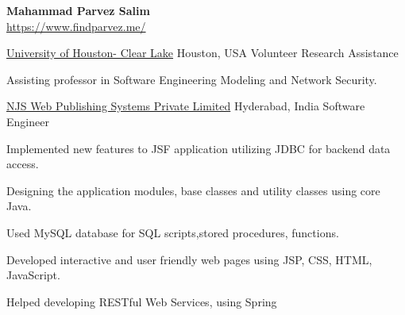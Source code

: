 \documentclass[10pt]{article}
\begin{document}
	
\begin{center}
	\textbf{\LARGE Mahammad Parvez Salim}\\[0.5ex]
	\href{https://www.findparvez.me/}{https://www.findparvez.me/}\\
\end{center}
\spacedhrule{-1.0ex}{-0.5ex}


\begin{indentsection}
\end{indentsection}
\spacedhrule{0.8ex}{0.0ex}


\headedsection
{\href{https://www.uhcl.edu/}{University of Houston- Clear Lake}}
{Houston, USA}
{Volunteer Research Assistance}
{}
{\vspace{-2.4ex}
	\begin{circlist}
	    \item  Assisting professor in Software Engineering Modeling and Network Security.
		
	\end{circlist}
}

\headedsection
{\href{https://wpslab.in/}{NJS Web Publishing Systems Private Limited}}
{Hyderabad, India}
{Software Engineer}
{}
{\vspace{-2.4ex}
	\begin{circlist}
	 
	    \item  Implemented new features to JSF application utilizing  JDBC for backend data access.
		\item Designing the application modules, base classes and utility classes using core Java.
		\item Used MySQL database for SQL scripts,stored procedures, functions.
		\item Developed interactive and user friendly web pages using JSP, CSS, HTML, JavaScript.
		\item Helped developing RESTful Web Services, using Spring
		
	\end{circlist}
}
\end{document}
